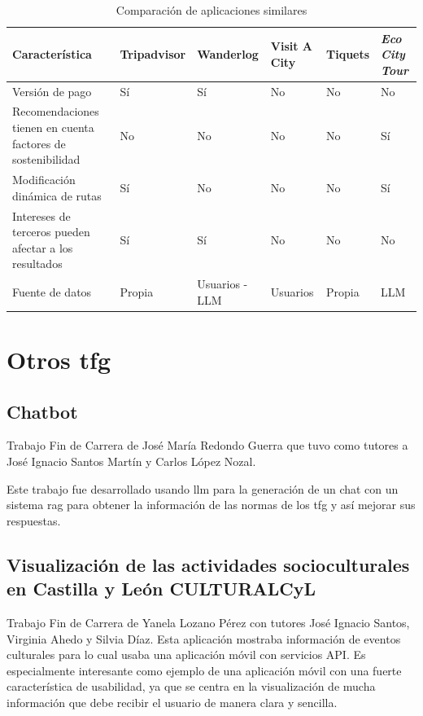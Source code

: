 \begin{table}[h]
	\centering
	\renewcommand{\arraystretch}{1.5} %
	\begin{tabular}{m{4.5cm} >{\centering\arraybackslash}m{2cm} >{\centering\arraybackslash}m{2cm} >{\centering\arraybackslash}m{2cm} >{\centering\arraybackslash}m{2cm} >{\centering\arraybackslash}m{2.5cm}} %
	\toprule
	\textbf{Característica} & \textbf{Tripadvisor} & \textbf{Wanderlog} & \textbf{Visit A City} & \textbf{Tiquets} & \textbf{\textit{Eco City Tour}} \\
	\midrule
	Versión de pago & Sí & Sí & No & No & No\\
	Recomendaciones tienen en cuenta factores de sostenibilidad & No & No & No & No & Sí\\
	Modificación dinámica de rutas & Sí & No & No & No & Sí\\
	Intereses de terceros pueden afectar a los resultados & Sí & Sí & No & No & No \\
	Fuente de datos & Propia & Usuarios - LLM & Usuarios & Propia & LLM\\
	\bottomrule
	\end{tabular}
	\caption{Comparación de aplicaciones similares} %
	\label{herramientasportipodeuso}
	\end{table}
\section{Otros \acrfull{tfg}}
	\subsection{Chatbot}
	Trabajo Fin de Carrera de José María Redondo Guerra \cite{chatbot_github} que tuvo como tutores a José Ignacio Santos Martín y Carlos López Nozal.
	
	Este trabajo fue desarrollado usando \acrfull{llm} para la generación de un chat con un sistema \acrshort{rag} para obtener la información de las normas de los \acrshort{tfg} y así mejorar sus respuestas.
	
	\subsection{Visualización de las actividades socioculturales en Castilla y León CULTURALCyL}
	Trabajo Fin de Carrera de Yanela Lozano Pérez con tutores José Ignacio Santos, Virginia Ahedo y Silvia Díaz.
	Esta aplicación mostraba información de eventos culturales para lo cual usaba una aplicación móvil con servicios API.
	Es especialmente interesante como ejemplo de una aplicación móvil con una fuerte característica de usabilidad, ya que se centra en la visualización de mucha información que debe recibir el usuario de manera clara y sencilla.